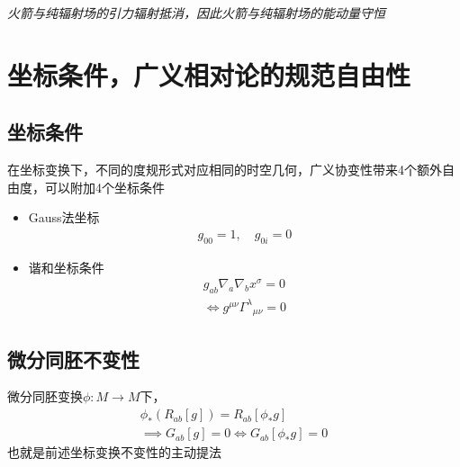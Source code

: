 \emph{火箭与纯辐射场的引力辐射抵消，因此火箭与纯辐射场的能动量守恒}

\section{坐标条件，广义相对论的规范自由性}

\subsection{坐标条件}

在坐标变换下，不同的度规形式对应相同的时空几何，广义协变性带来4个额外自由度，可以附加4个坐标条件
\begin{itemize}
    \item Gauss法坐标
    \begin{gather*}
        g_{00}=1,\quad g_{0i}=0
    \end{gather*}
    \item 谐和坐标条件
    \begin{gather*}
        g_{ab} \nabla_a \nabla_b x^{\sigma}=0
        \\
        \iff g^{\mu \nu} {\Gamma^{\lambda}}_{\mu \nu}=0
    \end{gather*}
\end{itemize}

\subsection{微分同胚不变性}

微分同胚变换$\phi:M \to M$下，
\begin{gather*}
    \phi_{*}(R_{ab}[g])=R_{ab}[\phi_{*} g]
    \\
    \implies G_{ab}[g]=0 \iff G_{ab}[\phi_{*}g]=0
\end{gather*}
也就是前述坐标变换不变性的主动提法